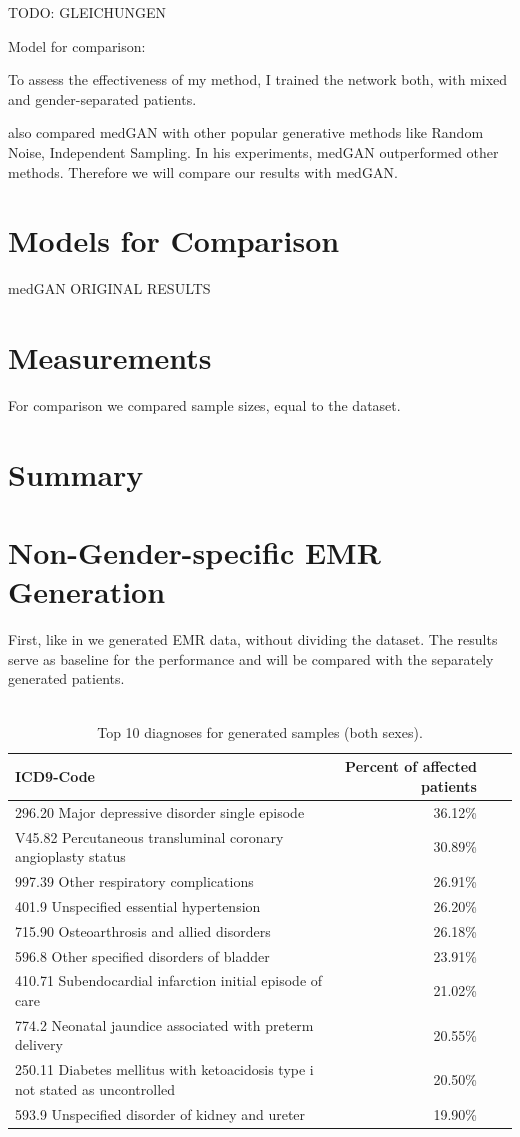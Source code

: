 \documentclass[11pt, a4paper]{book}
\begin{document}
TODO: GLEICHUNGEN

Model for comparison: 

To assess the effectiveness of my method, I trained the network both, with mixed and gender-separated patients. 

\cite{Choi2017} also compared medGAN with other popular generative methods like Random Noise, Independent Sampling. In his experiments, medGAN outperformed other methods. Therefore we will compare our results with medGAN.

\section{Models for Comparison}
medGAN ORIGINAL RESULTS
\section{Measurements}
For comparison we compared sample sizes, equal to the dataset.

\section{Summary}

\section{Non-Gender-specific EMR Generation}
First, like in \citep{Choi2017} we generated EMR data, without dividing the dataset. The results serve as baseline for the performance and will be compared with the separately generated patients.
\\
\\
\begin{table}
\begin{tabularx}{\textwidth}{p{}|r|X|r}
\textbf{ICD9-Code} & \textbf{Percent of affected patients}\\
\hline
296.20 Major depressive disorder single episode & 36.12\%\\
V45.82 Percutaneous transluminal coronary angioplasty status & 30.89\%\\
997.39 Other respiratory complications & 26.91\%\\
401.9 Unspecified essential hypertension & 26.20\%\\
715.90 Osteoarthrosis and allied disorders & 26.18\%\\
596.8 Other specified disorders of bladder & 23.91\%\\
410.71 Subendocardial infarction initial episode of care & 21.02\%\\
774.2 Neonatal jaundice associated with preterm delivery & 20.55\%\\
250.11 Diabetes mellitus with ketoacidosis type i not stated as uncontrolled & 20.50\%\\
593.9 Unspecified disorder of kidney and ureter & 19.90\%\\
\end{tabularx}
\caption{\label{tab:top10-icd-mixed}Top 10 diagnoses for generated samples (both sexes).}
\end{table}
\end{document}
